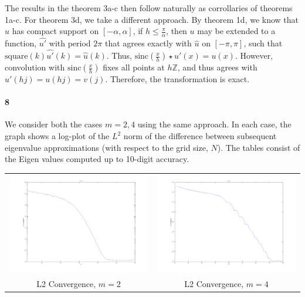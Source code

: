 \documentclass{article}
\begin{document}
The results in the theorem 3a-c then follow naturally as corrollaries of theorems 1a-c.  For theorem 3d, we take a different approach.  By theorem 1d, we know that $\hat{u}$ has compact support on $[-\alpha, \alpha]$, if $h \leq \frac{\pi}{\alpha}$, then $u$ may be extended to a function, $\hat{u'}$ with period $2\pi$ that agrees exactly with $\hat{u}$ on $[-\pi, \pi]$, such that $\textrm{square}(k) \hat{u'}(k) = \hat{u}(k)$.  Thus, $\textrm{sinc}(\frac{x}{h}) \star u'(x) = u(x)$.  However, convolution with $\textrm{sinc}(\frac{x}{h})$ fixes all points at $h \mathbb{Z}$, and thus agrees with $u'(h j) = u(h j) = v(j)$.  Therefore, the transformation is exact.

\paragraph{8}
We consider both the cases $m=2,4$ using the same approach.  In each case, the graph shows a log-plot of the $L^2$ norm of the difference between subsequent eigenvalue approximations (with respect to the grid size, $N$).  The tables consist of the Eigen values computed up to 10-digit accuracy.

\begin{center}
\begin{tabular}{cc}
\includegraphics[width=3.5in]{hw1_part2_p8_fig1.png} & \includegraphics[width=3.5in]{hw1_part2_p8_fig2.png} \\
L2 Convergence, $m=2$ & L2 Convergence, $m=4$ \\
\end{tabular}
\end{center}
\end{document}
